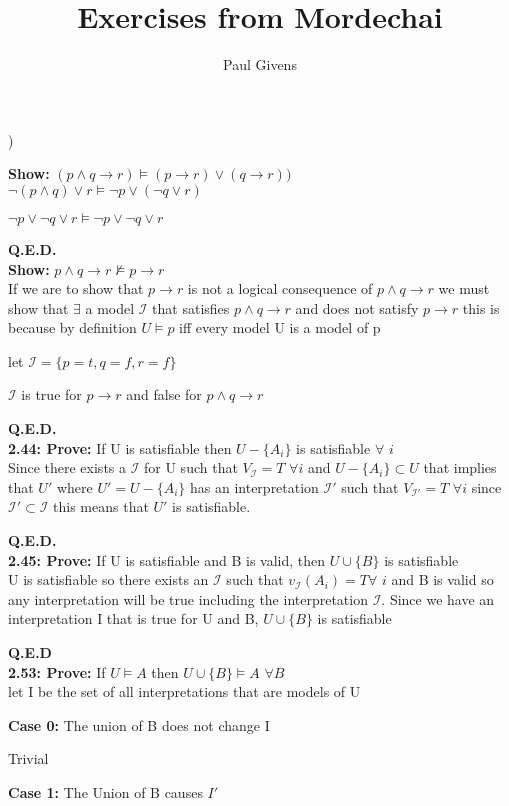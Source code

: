 \documentclass[letterpaper]{article}
\title{Exercises from Mordechai}
\author{Paul Givens}
\begin{document}
) 

\textbf{Show:}
$ (p \wedge q \rightarrow r) \vDash (p \rightarrow r) \vee (q \rightarrow r)) $
\\[1ex]

$ \neg (p \wedge q) \vee r \vDash \neg p \vee (\neg q \vee r) $

$ \neg p \vee \neg q \vee r \vDash \neg p \vee \neg q \vee r $ 

\textbf{Q.E.D.}
\\[1ex]

\textbf{Show:}
$ p \wedge q \rightarrow r \nvDash p \rightarrow r $
\\[1ex]

If we are to show that $ p \rightarrow r $ is not a logical consequence of
$ p \wedge q \rightarrow r $ we must show that $ \exists $ a model
$ \mathscr{I} $ that satisfies $ p \wedge q \rightarrow r $ and does not 
satisfy $ p \rightarrow r $ this is because by definition 
$ U \vDash p $ iff every model U is a model of p 

let $ \mathscr{I} = \{ p = t, q = f, r = f\}$ 

$ \mathscr{I} $ is true for $ p \rightarrow r $ and false for 
$ p \wedge q \rightarrow r $

\textbf{Q.E.D.}
\\[1ex]

\textbf{2.44: Prove:}
If U is satisfiable then $ U - \{A _{i} \} $ is satisfiable $ \forall $ $i$ 
\\[1ex]

Since there exists a $ \mathscr{I} $ for U such that $V_{\mathscr{I}} = T $ 
$\forall i$ and $  U - \{A _{i} \} \subset U$ that implies that $U'$ 
where $U' =  U - \{A _{i} \}$ has an interpretation $\mathscr{I}'$ such that 
$V_{\mathscr{I}'} = T $ $\forall i$ since $\mathscr{I}' \subset \mathscr{I}$
this means that $U'$ is satisfiable.

\textbf{Q.E.D.}
\\[1ex]

\textbf{2.45: Prove:}
If U is satisfiable and B is valid, then $ U \cup \{B\} $ is satisfiable
\\[1ex]

U is satisfiable so there exists an $\mathscr{I}$ such that $v_{\mathscr{I}}
(A_{i}) = T \forall$ $i$ and B is valid so any interpretation will be true
including the interpretation $\mathscr{I}$. Since we have an interpretation
I that is true for U and B, $U \cup \{B\} $ is satisfiable

\textbf{Q.E.D}
\\[1ex]

\textbf{2.53: Prove:}
If $U \vDash A$ then $U \cup \{B\} \vDash A $ $\forall B $
\\[1ex]

let I be the set of all interpretations that are models of U

\textbf{Case 0:}
The union of B does not change I

Trivial

\textbf{Case 1:}
The Union of B causes $I'$
\end{document}
